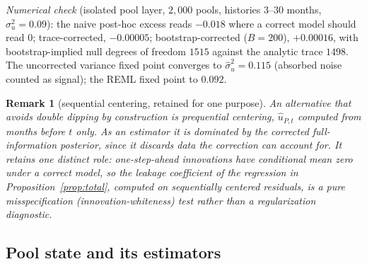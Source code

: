 \documentclass[11pt]{article}
\newtheorem{remark}[proposition]{Remark}
\begin{document}
\emph{Numerical check} (isolated pool layer, $2{,}000$ pools, histories $3$--$30$
months, $\sigma_u^2=0.09$): the naive post-hoc excess reads $-0.018$ where a correct
model should read $0$; trace-corrected, $-0.00005$; bootstrap-corrected
($B=200$), $+0.00016$, with bootstrap-implied null degrees of freedom $1515$ against
the analytic trace $1498$. The uncorrected variance fixed point converges to
$\hat\sigma_u^2=0.115$ (absorbed noise counted as signal); the REML fixed point to
$0.092$.

\begin{remark}[sequential centering, retained for one purpose]
An alternative that avoids double dipping by construction is prequential centering,
$\hat u_{P,t}$ computed from months before $t$ only. As an \emph{estimator} it is
dominated by the corrected full-information posterior, since it discards data the
correction can account for. It retains one distinct role: one-step-ahead innovations
have conditional mean zero under a correct model, so the leakage coefficient of the
regression in Proposition~\ref{prop:total}, computed on sequentially centered
residuals, is a pure misspecification (innovation-whiteness) test rather than a
regularization diagnostic.
\end{remark}

\subsection{Pool state and its estimators}\label{sec:poolstate}
\end{document}
